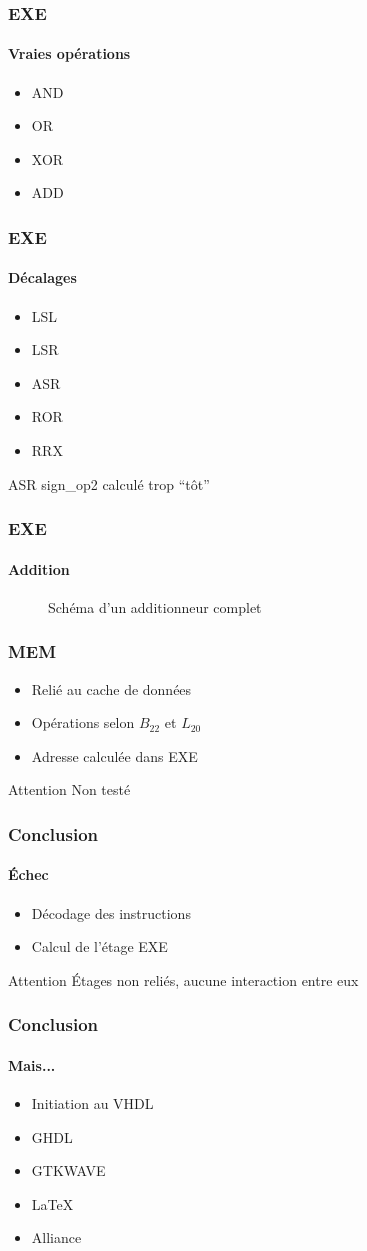 \documentclass{beamer}
\begin{document}
	\begin{frame}
		\frametitle{EXE}
		\framesubtitle{Vraies opérations}
		\begin{itemize}
			\item AND
			\item OR
			\item XOR
			\item ADD
		\end{itemize}
	\end{frame}

	\begin{frame}
		\frametitle{EXE}
		\framesubtitle{Décalages}
		\begin{itemize}
			\item LSL \checkmark
			\item LSR \checkmark
			\item ASR
			\item ROR \checkmark
			\item RRX \checkmark
		\end{itemize}
		\begin{alertblock}{ASR}
			sign\_op2 calculé trop ``tôt''
		\end{alertblock}
	\end{frame}
	
	\begin{frame}
		\frametitle{EXE}
		\framesubtitle{Addition}
		\begin{figure}[H]
			\centering
			\def\svgwidth{\columnwidth}
			\scriptsize{
				
			}
			\caption{Schéma d'un additionneur complet}
		\end{figure}
	\end{frame}

	
	\begin{frame}
		\frametitle{MEM}
		\begin{itemize}
			\item Relié au cache de données
			\item Opérations selon $B_{22}$ et $L_{20}$
			\item Adresse calculée dans EXE
		\end{itemize}
		\begin{alertblock}{Attention}
			Non testé
		\end{alertblock}
	\end{frame}
	
	\begin{frame}
		\frametitle{Conclusion}
		\framesubtitle{Échec}
		\begin{itemize}
			\item Décodage des instructions
			\item Calcul de l'étage EXE
		\end{itemize}
		\begin{alertblock}{Attention}
			Étages non reliés, aucune interaction entre eux
		\end{alertblock}
	\end{frame}

	\begin{frame}
		\frametitle{Conclusion}
		\framesubtitle{Mais...}
		\begin{itemize}
			\item Initiation au VHDL
			\item GHDL
			\item GTKWAVE
			\item \LaTeX
			\item Alliance
		\end{itemize}
	\end{frame}
\end{document}
